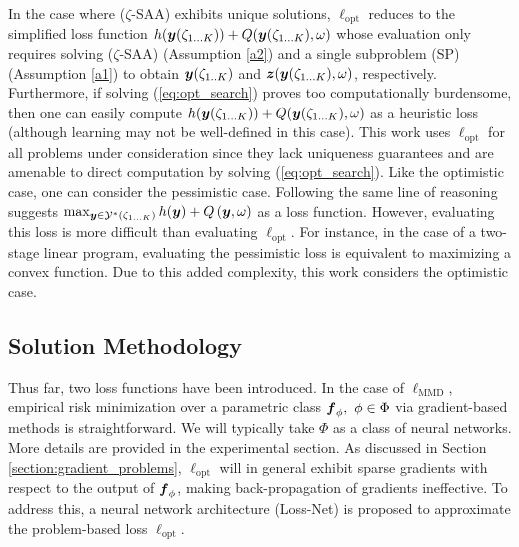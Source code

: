In the case where ($\zeta$-SAA) exhibits unique solutions, $\ell_{\text{opt}}$ reduces to the simplified loss function $h(\boldsymbol{y}(\zeta_{1...K})) + Q(\boldsymbol{y}(\zeta_{1...K}), \omega)$ whose evaluation only requires solving \hbox{($\zeta$-SAA)} (Assumption \ref{a2}) and a single subproblem (SP) (Assumption \ref{a1}) to obtain $\boldsymbol{y}(\zeta_{1..K})$ and $\boldsymbol{z}(\boldsymbol{y}(\zeta_{1...K}), \omega)$, respectively. Furthermore, if solving (\ref{eq:opt_search}) proves too computationally burdensome, then one can easily compute $h(\boldsymbol{y}(\zeta_{1...K})) + Q(\boldsymbol{y}(\zeta_{1...K}), \omega)$ as a heuristic loss (although learning may not be well-defined in this case). This work uses $\ell_{\text{opt}}$ for all problems under consideration since they lack uniqueness guarantees and are amenable to direct computation by solving (\ref{eq:opt_search}). Like the optimistic case, one can consider the pessimistic case. Following the same line of reasoning suggests \hbox{$\max_{\boldsymbol{y} \in \mathcal{Y}^*(\zeta_{1 \hdots K})} h(\boldsymbol{y}) + Q \left(\boldsymbol{y}, \omega \right)$} as a loss function. However, evaluating this loss is more difficult than evaluating $\ell_{\text{opt}}$. For instance, in the case of a two-stage linear program, evaluating the pessimistic loss is equivalent to maximizing a convex function. Due to this added complexity, this work considers the optimistic case.  

\subsection{Solution Methodology}\label{subsection:solution_approach}
Thus far, two loss functions have been introduced. In the case of  $\ell_{\text{MMD}}$, empirical risk minimization over a parametric class $\boldsymbol{f}_{\phi}, \ \phi \in \Phi$ via gradient-based methods is straightforward. We will typically take $\Phi$ as a class of neural networks. More details are provided in the experimental section. As discussed in Section \ref{section:gradient_problems}, $\ell_{\text{opt}}$ will in general exhibit sparse gradients with respect to the output of $\boldsymbol{f}_{\phi}$, making back-propagation of gradients ineffective. To address this, a neural network architecture (Loss-Net) is proposed to approximate the problem-based loss $\ell_{\text{opt}}$.


